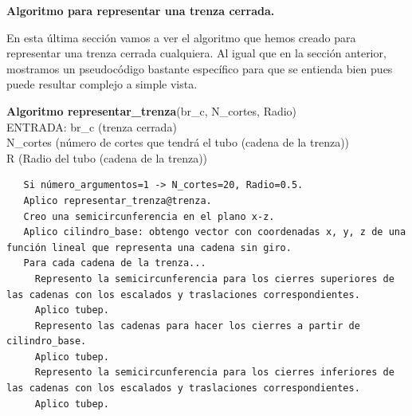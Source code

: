  \begin{center}
 	\textbf{Algoritmo para representar una trenza cerrada.}
 \end{center} 
 En esta última sección vamos a ver el algoritmo que hemos creado para representar una trenza cerrada cualquiera. Al igual que en la sección anterior, mostramos un pseudocódigo bastante específico para que se entienda bien pues puede resultar complejo a simple vista. 
\begin{alg}
	\textbf{Algoritmo representar\_trenza}(br\_c, N\_cortes, Radio)\\
	ENTRADA: br\_c (trenza cerrada)\\
	\hspace*{2.2cm} N\_cortes (número de cortes que tendrá el tubo (cadena de la trenza))\\
	\hspace*{2.2cm} R (Radio del tubo (cadena de la trenza))
	
\begin{lstlisting}
   Si número_argumentos=1 -> N_cortes=20, Radio=0.5.
   Aplico representar_trenza@trenza.
   Creo una semicircunferencia en el plano x-z.
   Aplico cilindro_base: obtengo vector con coordenadas x, y, z de una función lineal que representa una cadena sin giro.
   Para cada cadena de la trenza...
     Represento la semicircunferencia para los cierres superiores de las cadenas con los escalados y traslaciones correspondientes.
     Aplico tubep.
     Represento las cadenas para hacer los cierres a partir de cilindro_base.
     Aplico tubep.
     Represento la semicircunferencia para los cierres inferiores de las cadenas con los escalados y traslaciones correspondientes.
     Aplico tubep.
\end{lstlisting}
\end{alg}